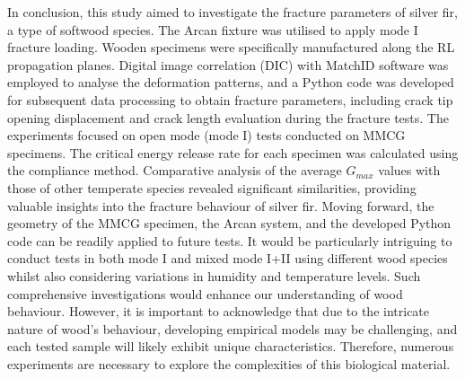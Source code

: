\documentclass[3p,times,procedia]{elsarticle}
\begin{document}
In conclusion, this study aimed to investigate the fracture parameters of silver fir, a type of softwood species. The Arcan fixture was utilised to apply mode I fracture loading. Wooden specimens were specifically manufactured along the RL propagation planes. Digital image correlation (DIC) with MatchID software was employed to analyse the deformation patterns, and a Python code was developed for subsequent data processing to obtain fracture parameters, including crack tip opening displacement and crack length evaluation during the fracture tests.
The experiments focused on open mode (mode I) tests conducted on MMCG specimens. The critical energy release rate for each specimen was calculated using the compliance method. Comparative analysis of the average $G_{max}$ values with those of other temperate species revealed significant similarities, providing valuable insights into the fracture behaviour of silver fir.
Moving forward, the geometry of the MMCG specimen, the Arcan system, and the developed Python code can be readily applied to future tests. It would be particularly intriguing to conduct tests in both mode I and mixed mode I+II using different wood species whilst also considering variations in humidity and temperature levels. Such comprehensive investigations would enhance our understanding of wood behaviour. However, it is important to acknowledge that due to the intricate nature of wood's behaviour, developing empirical models may be challenging, and each tested sample will likely exhibit unique characteristics. Therefore, numerous experiments are necessary to explore the complexities of this biological material.



%
%
\end{document}
